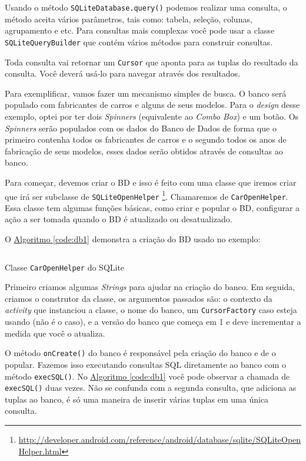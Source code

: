 \documentclass[a4paper,12pt,brazil,oneside]{book}
\begin{document}
		Usando o método \texttt{SQLiteDatabase.query()}  podemos realizar uma consulta, o método aceita vários parâmetros, tais como: tabela, seleção, colunas, agrupamento e etc. Para consultas mais complexas você pode usar a classe \texttt{SQLiteQueryBuilder} que contém vários métodos para construir consultas.

		Toda consulta vai retornar um \texttt{Cursor} que aponta para as tuplas do resultado da consulta. Você deverá usá-lo para navegar através dos resultados.

		Para exemplificar, vamos fazer um mecanismo simples de busca. O banco será populado com fabricantes de carros e alguns de seus modelos. Para o \emph{design} desse exemplo, optei por ter dois \emph{Spinners} (equivalente ao \emph{Combo Box}) e um botão. Os \emph{Spinners} serão populados com os dados do Banco de Dados de forma que o primeiro contenha todos os fabricantes de carros e o segundo todos os anos de fabricação de seus modelos, esses dados serão obtidos através de consultas ao banco.

		Para começar, devemos  criar o BD e isso é feito com uma classe que iremos criar que irá ser subclasse de \texttt{SQLiteOpenHelper}
\footnote{\href{http://developer.android.com/reference/android/database/sqlite/SQLiteOpenHelper.html}{http://developer.android.com/reference/android/database/sqlite/SQLiteOpenHelper.html}}.
 Chamaremos de \texttt{CarOpenHelper}. Essa classe tem algumas funções básicas, como criar e popular o BD, configurar a ação a ser tomada quando o BD é atualizado ou desatualizado.

		O \hyperref[code:db1]{Algoritmo \ref*{code:db1}} demonstra a criação do BD usado no exemplo:

		\begin{listing}[H]
		\inputminted[linenos=true,fontsize=\small,frame=lines, framesep=2mm, tabsize=2,numbersep=5pt]{java}{src/api/storage/db1.java}
		\caption{Classe \texttt{CarOpenHelper} do SQLite}
		\label{code:db1}
		\end{listing} 	

		Primeiro criamos algumas \emph{Strings} para ajudar na criação do banco. Em seguida, criamos o construtor da classe, os argumentos passados são: o contexto da \emph{activity} que instanciou a classe, o nome do banco, um \texttt{CursorFactory} caso esteja usando (não é o caso), e a versão do banco que começa em 1 e deve incrementar a medida que você o atualiza. 
		
		O método \texttt{onCreate()} do banco é responsável pela criação do banco e de o popular. Fazemos isso executando consultas SQL diretamente ao banco com o método \texttt{execSQL()}. No \hyperref[code:db1]{Algoritmo \ref*{code:db1}} você pode observar a chamada de \texttt{execSQL()} duas vezes. Não se confunda com a segunda consulta, que adiciona as tuplas ao banco, é só uma maneira de inserir várias tuplas em uma única consulta.
\end{document}
